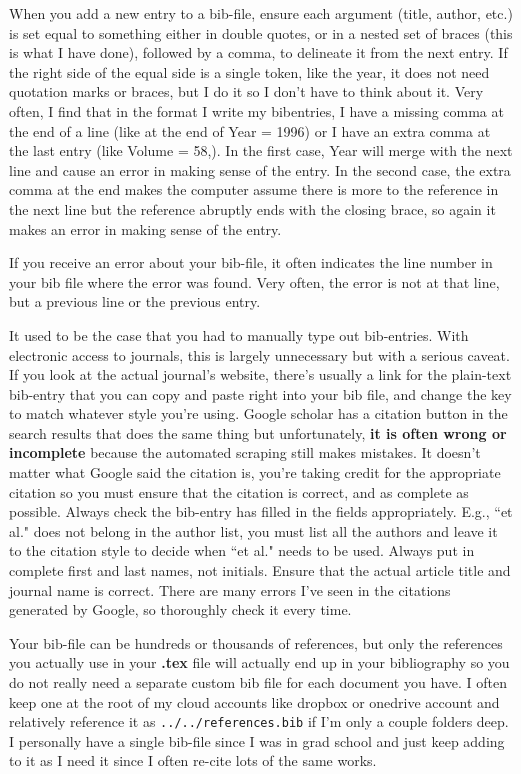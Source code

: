 \documentclass[12pt]{article}
\begin{document}
When you add a new entry to a bib-file, ensure each argument (title, author, etc.) is set equal to something either in double quotes, or in a nested set of braces (this is what I have done), followed by a comma, to delineate it from the next entry. If the right side of the equal side is a single token, like the year, it does not need quotation marks or braces, but I do it so I don't have to think about it. Very often, I find that in the format I write my bibentries, I have a missing comma at the end of a line (like at the end of Year = 1996) or I have an extra comma at the last entry (like Volume = 58,). In the first case, Year will merge with the next line and cause an error in making sense of the entry. In the second case, the extra comma at the end makes the computer assume there is more to the reference in the next line but the reference abruptly ends with the closing brace, so again it makes an error in making sense of the entry.

If you receive an error about your bib-file, it often indicates the line number in your bib file where the error was found. Very often, the error is not at that line, but a previous line or the previous entry. 

It used to be the case that you had to manually type out bib-entries. With electronic access to journals, this is largely unnecessary but with a serious caveat. If you look at the actual journal's website, there's usually a link for the plain-text bib-entry that you can copy and paste right into your bib file, and change the key to match whatever style you're using. Google scholar has a citation button in the search results that does the same thing but unfortunately, \textbf{it is often wrong or incomplete} because the automated scraping still makes mistakes. It doesn't matter what Google said the citation is, you're taking credit for the appropriate citation so you must ensure that the citation is correct, and as complete as possible. Always check the bib-entry has filled in the fields appropriately. E.g., ``et al." does not belong in the author list, you must list all the authors and leave it to the citation style to decide when ``et al." needs to be used. Always put in complete first and last names, not initials. Ensure that the actual article title and journal name is correct. There are many errors I've seen in the citations generated by Google, so thoroughly check it every time.




Your bib-file can be hundreds or thousands of references, but only the references you actually use in your \textbf{.tex} file will actually end up in your bibliography so you do not really need a separate custom bib file for each document you have. I often keep one at the root of my cloud accounts like dropbox or onedrive account and relatively reference it as \texttt{../../references.bib} if I'm only a couple folders deep. I personally have a single bib-file since I was in grad school and just keep adding to it as I need it since I often re-cite lots of the same works. 
\end{document}
